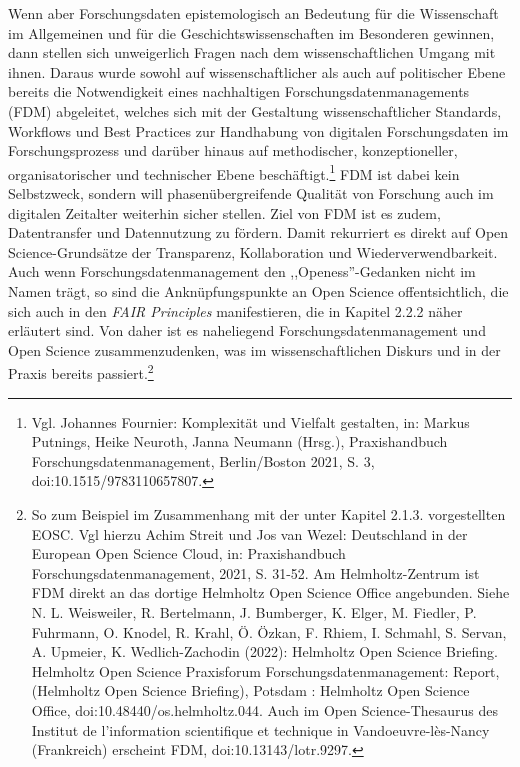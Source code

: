 Wenn aber Forschungsdaten epistemologisch an Bedeutung für die Wissenschaft im Allgemeinen und für die Geschichtswissenschaften im Besonderen gewinnen, dann stellen sich unweigerlich Fragen nach dem wissenschaftlichen Umgang mit ihnen. Daraus wurde sowohl auf wissenschaftlicher als auch auf politischer Ebene bereits die Notwendigkeit eines nachhaltigen Forschungsdatenmanagements (FDM) abgeleitet, welches sich mit der Gestaltung wissenschaftlicher Standards, Workflows und Best Practices zur Handhabung von digitalen Forschungsdaten im Forschungsprozess und darüber hinaus auf methodischer, konzeptioneller, organisatorischer und technischer Ebene beschäftigt.\footnote{Vgl. Johannes Fournier: Komplexität und Vielfalt gestalten, in: Markus Putnings, Heike Neuroth, Janna Neumann (Hrsg.), Praxishandbuch Forschungsdatenmanagement, Berlin/Boston 2021, S. 3, doi:10.1515/9783110657807.} FDM ist dabei kein Selbstzweck, sondern will phasenübergreifende Qualität von Forschung auch im digitalen Zeitalter weiterhin sicher stellen. Ziel von FDM ist es zudem, Datentransfer und Datennutzung zu fördern. Damit rekurriert es direkt auf Open Science-Grundsätze der Transparenz, Kollaboration und Wiederverwendbarkeit. Auch wenn Forschungsdatenmanagement den ,,Openess''-Gedanken nicht im Namen trägt, so sind die Anknüpfungspunkte an Open Science offentsichtlich, die sich auch in den \textit{FAIR Principles} manifestieren, die in Kapitel 2.2.2 näher erläutert sind. Von daher ist es naheliegend Forschungsdatenmanagement und Open Science zusammenzudenken, was im wissenschaftlichen Diskurs und in der Praxis bereits passiert.\footnote{So zum Beispiel im Zusammenhang mit der unter Kapitel 2.1.3. vorgestellten EOSC. Vgl hierzu Achim Streit und Jos van Wezel: Deutschland in der European Open Science Cloud, in: Praxishandbuch Forschungsdatenmanagement, 2021, S. 31-52. Am Helmholtz-Zentrum ist FDM direkt an das dortige Helmholtz Open Science Office angebunden. Siehe N. L. Weisweiler, R. Bertelmann, J. Bumberger, K. Elger, M. Fiedler, P. Fuhrmann, O. Knodel, R. Krahl, Ö. Özkan, F. Rhiem, I. Schmahl, S. Servan, A. Upmeier, K. Wedlich-Zachodin (2022): Helmholtz Open Science Briefing. Helmholtz Open Science Praxisforum Forschungsdatenmanagement: Report, (Helmholtz Open Science Briefing), Potsdam : Helmholtz Open Science Office, doi:10.48440/os.helmholtz.044. Auch im Open Science-Thesaurus des Institut de l’information scientifique et technique in Vandoeuvre-lès-Nancy (Frankreich) erscheint FDM, doi:10.13143/lotr.9297.}

